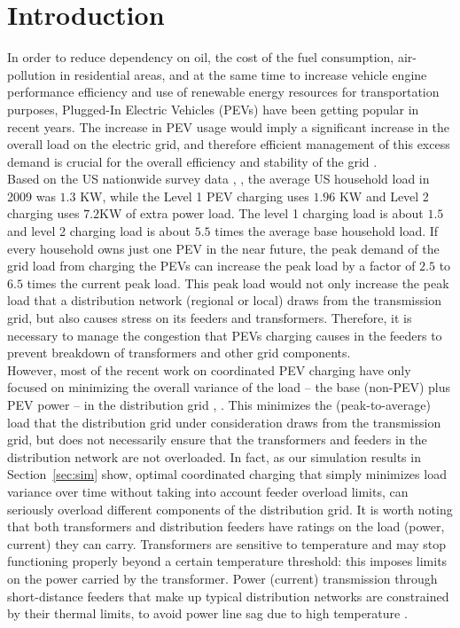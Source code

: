 \documentclass[12pt,draftcls,onecolumn]{IEEEtran}
\begin{document}
\section{Introduction}
\indent In order to reduce dependency on oil, the cost of the fuel consumption, air-pollution in residential areas, and at the same time to increase vehicle engine performance efficiency and use of renewable energy resources for transportation purposes, Plugged-In Electric Vehicles (PEVs) have been getting popular in recent years. The increase in PEV usage would imply a significant increase in the overall load on the electric grid, and therefore efficient management of this excess demand is crucial for the overall efficiency and stability of the grid \cite{HT09}.\\
\indent Based on the US nationwide survey data \cite{US09}, \cite{PR04}, the average US household load in 2009 was $1.3$ KW, while the Level 1 PEV charging uses $1.96$ KW and Level 2 charging uses $7.2$KW of extra power load. The level 1 charging load is about $1.5$ and level 2 charging load is about $5.5$ times the average base household load. If every household owns just one PEV in the near future, the peak demand of the grid load from charging the PEVs can increase the peak load by a factor of $2.5$ to $6.5$ times the current peak load. This peak load would not only increase the peak load that a distribution network (regional or local) draws from the transmission grid, but also causes stress on its feeders and transformers. Therefore, it is necessary to manage the congestion that PEVs charging causes in the feeders to prevent breakdown of transformers and other grid components.\\
\indent However, most of the recent work on coordinated PEV charging have only focused on minimizing the overall variance of the load -- the base (non-PEV) plus PEV power -- in the distribution grid \cite{MCH10}, \cite{GTL13}. This minimizes the (peak-to-average) load that the distribution grid under consideration draws from the transmission grid, but does not necessarily ensure that the transformers and feeders in the distribution network are not overloaded. In fact, as our simulation results in Section~\ref{sec:sim} show, optimal coordinated charging that simply minimizes load variance over time without taking into account feeder overload limits, can seriously overload different components of the distribution grid. It is worth noting that both transformers and distribution feeders have ratings on the load (power, current) they can carry. Transformers are sensitive to temperature and may stop functioning properly beyond a certain temperature threshold: this imposes limits on the power carried by the transformer. Power (current) transmission through short-distance feeders that make up typical distribution networks are constrained by their thermal limits, to avoid power line sag due to high temperature \cite{GE79}.\\
\end{document}
